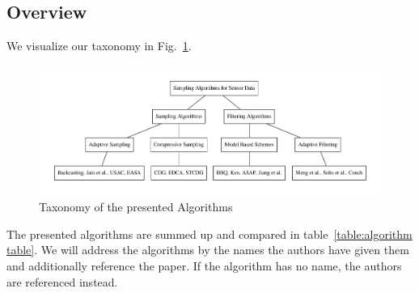\subsection{Overview}
\label{sec:Overview}

We visualize our taxonomy in Fig.~\ref{fig:Taxonomy}.

\begin{figure}[h]
\includegraphics[width=\linewidth]{images/taxonomy.pdf}
\caption{Taxonomy of the presented Algorithms}
\label{fig:Taxonomy}
\centering
\end{figure}


The presented algorithms are summed up and compared in
table~\ref{table:algorithm table}. We will address the algorithms by the names
the authors have given them and additionally reference the paper. If the
algorithm has no name, the authors are referenced instead.

